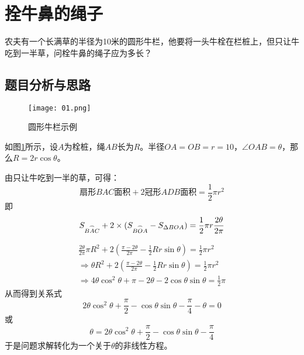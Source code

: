 \documentclass{math201}
\date{\today}
\begin{document}
\makecover


\section{拴牛鼻的绳子}
农夫有一个长满草的半径为10米的圆形牛栏，他要将一头牛栓在栏桩上，但只让牛吃到一半草，问栓牛鼻的绳子应为多长？

\subsection{题目分析与思路}


\begin{figure}[htbp]  
    \centering\texttt{[image: 01.png]}  
    \caption{圆形牛栏示例}     
    \label{img01}   
\end{figure}
    

如图\ref*{img01}所示，设$A$为栓桩，绳$AB$长为$R$。半径$OA=OB=r=10$，$\angle OAB=\theta$，那么$R=2r\cos\theta$。


由只让牛吃到一半的草，可得：
\begin{equation}
    \mbox{扇形}BAC\mbox{面积} + 2\mbox{冠形}ADB\mbox{面积} = \frac{1}{2}\pi r^2
\end{equation}
即
\begin{equation}
    S_{\overset{\Huge\frown}{BAC}} + 2\times(S_{\overset{\Huge\frown}{BOA}} - S_{\Delta BOA}) = \frac{1}{2}\pi r \\
    \frac{2\theta}{2\pi}
    \nonumber
\end{equation}

\begin{equation}
    \begin{split}
        \frac{2\theta}{2\pi}\pi R^2 + 2(\frac{\pi - 2\theta}{2\pi} - \frac{1}{2}Rr\sin\theta) = \frac{1}{2}\pi r^2 \\
        \Rightarrow \theta R^2 + 2(\frac{\pi - 2\theta}{2\pi} - \frac{1}{2}Rr\sin\theta) = \frac{1}{2}\pi r^2 \\
        \Rightarrow 4\theta\cos^2\theta + \pi - 2\theta - 2\cos\theta\sin\theta = \frac{1}{2}\pi
    \end{split}
    \nonumber
\end{equation}
从而得到关系式
\begin{equation}
    2\theta\cos^2\theta + \frac{\pi}{2} - \cos\theta\sin\theta - \frac{\pi}{4} - \theta = 0
\end{equation}
或
\begin{equation}
    \theta = 2\theta\cos^2\theta + \frac{\pi}{2} - \cos\theta\sin\theta - \frac{\pi}{4}
\end{equation}
于是问题求解转化为一个关于$\theta$的非线性方程。
\end{document}
